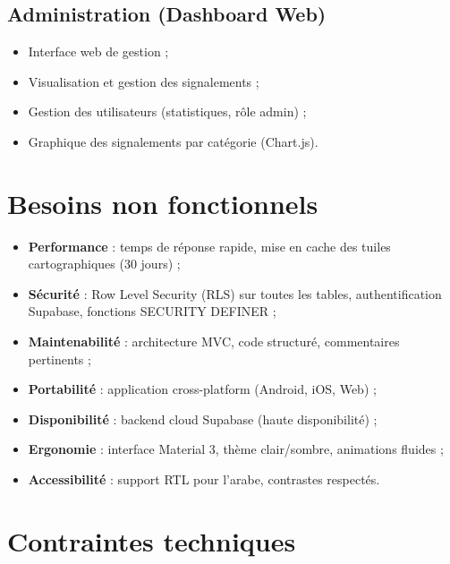 \documentclass[12pt,a4paper]{report}
\begin{document}
\subsection{Administration (Dashboard Web)}
\begin{itemize}
    \item Interface web de gestion ;
    \item Visualisation et gestion des signalements ;
    \item Gestion des utilisateurs (statistiques, rôle admin) ;
    \item Graphique des signalements par catégorie (Chart.js).
\end{itemize}

\section{Besoins non fonctionnels}

\begin{itemize}
    \item \textbf{Performance} : temps de réponse rapide, mise en cache des tuiles cartographiques (30 jours) ;
    \item \textbf{Sécurité} : Row Level Security (RLS) sur toutes les tables, authentification Supabase, fonctions SECURITY DEFINER ;
    \item \textbf{Maintenabilité} : architecture MVC, code structuré, commentaires pertinents ;
    \item \textbf{Portabilité} : application cross-platform (Android, iOS, Web) ;
    \item \textbf{Disponibilité} : backend cloud Supabase (haute disponibilité) ;
    \item \textbf{Ergonomie} : interface Material 3, thème clair/sombre, animations fluides ;
    \item \textbf{Accessibilité} : support RTL pour l'arabe, contrastes respectés.
\end{itemize}

\section{Contraintes techniques}
\end{document}
